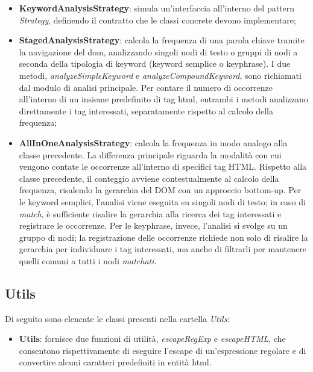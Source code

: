 \begin{itemize}
  \item \textbf{KeywordAnalysisStrategy}: simula un’interfaccia all’interno del pattern \textit{Strategy}, definendo il contratto che le classi concrete devono implementare;
  \item \textbf{StagedAnalysisStrategy}: calcola la frequenza di una parola chiave tramite la navigazione del \gls{dom}, analizzando singoli nodi di testo o gruppi di nodi a seconda della tipologia di keyword (keyword semplice o keyphrase). I due metodi, \textit{analyzeSimpleKeyword} e \textit{analyzeCompoundKeyword}, sono richiamati dal modulo di analisi principale. Per contare il numero di occorrenze all’interno di un insieme predefinito di tag \gls{html}, entrambi i metodi analizzano direttamente i tag interessati, separatamente rispetto al calcolo della frequenza;
  \item \textbf{AllInOneAnalysisStrategy}: calcola la frequenza in modo analogo alla classe precedente. La differenza principale riguarda la modalità con cui vengono contate le occorrenze all’interno di specifici tag HTML. Rispetto alla classe precedente, il conteggio avviene contestualmente al calcolo della frequenza, risalendo la gerarchia del DOM con un approccio bottom-up. Per le keyword semplici, l’analisi viene eseguita su singoli nodi di testo; in caso di \textit{match}, è sufficiente risalire la gerarchia alla ricerca dei tag interessati e registrare le occorrenze. Per le keyphrase, invece, l’analisi si svolge su un gruppo di nodi; la registrazione delle occorrenze richiede non solo di risalire la gerarchia per individuare i tag interessati, ma anche di filtrarli per mantenere quelli comuni a tutti i nodi \textit{matchati}.
\end{itemize}

\subsection{Utils}

\par Di seguito sono elencate le classi presenti nella cartella \textit{Utils}:

\begin{itemize}
  \item \textbf{Utils}: fornisce due funzioni di utilità, \textit{escapeRegExp} e \textit{escapeHTML}, che consentono rispettivamente di eseguire l’escape di un’espressione regolare e di convertire alcuni caratteri predefiniti in entità \gls{html}. 
\end{itemize}

